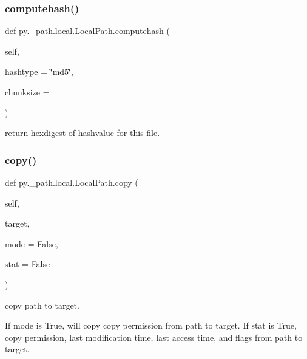 \subsubsection{\texorpdfstring{computehash()}{computehash()}}
{\footnotesize\ttfamily def py.\+\_\+path.\+local.\+Local\+Path.\+computehash (\begin{DoxyParamCaption}\item[{}]{self,  }\item[{}]{hashtype = {\ttfamily \char`\"{}md5\char`\"{}},  }\item[{}]{chunksize = {} }\end{DoxyParamCaption})}

\begin{DoxyVerb}return hexdigest of hashvalue for this file. \end{DoxyVerb}
 \mbox{\label{classpy_1_1__path_1_1local_1_1_local_path_aa81dad6bcbc3a9c0271a85ccd5ba4ac2}} 
\subsubsection{\texorpdfstring{copy()}{copy()}}
{\footnotesize\ttfamily def py.\+\_\+path.\+local.\+Local\+Path.\+copy (\begin{DoxyParamCaption}\item[{}]{self,  }\item[{}]{target,  }\item[{}]{mode = {\ttfamily False},  }\item[{}]{stat = {\ttfamily False} }\end{DoxyParamCaption})}

\begin{DoxyVerb}copy path to target.

    If mode is True, will copy copy permission from path to target.
    If stat is True, copy permission, last modification
    time, last access time, and flags from path to target.
\end{DoxyVerb}
 \mbox{\label{classpy_1_1__path_1_1local_1_1_local_path_a7c88510712862f000c40878716e5db82}} 
